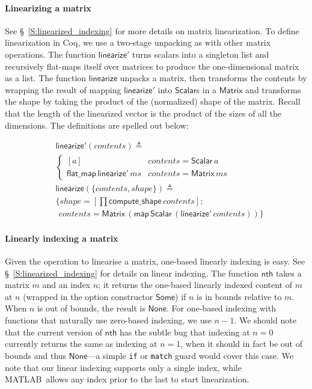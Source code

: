 \documentclass[11pt,conference]{IEEEtran}
\newcommand{\matlab}{MATLAB}
\newcommand{\var}[1]{\mathit{#1}}
\newcommand{\func}[1]{\mathsf{#1}}
\theoremstyle{plain} %
\theoremstyle{definition}
\theoremstyle{remark}
\begin{document}
\paragraph{Linearizing a matrix}\label{S:linearize_coq} See
\S~\ref{S:linearized_indexing} for more details on matrix linearization. To
define linearization in Coq, we use a two-stage unpacking as with other matrix
operations. The function \(\func{linearize'}\) turns scalars into a singleton
list and recursively flat-maps itself over matrices to produce the
one-dimensional matrix as a list. The function \(\func{linearize}\) unpacks a
matrix, then transforms the contents by wrapping the result of mapping
\(\func{linearize'}\) into \(\func{Scalar}\)s in a \(\func{Matrix}\) and
transforms the shape by taking the product of the (normalized) shape of the
matrix. Recall that the length of the linearized vector is the product of the
sizes of all the dimensions. The definitions are spelled out below:

\begin{align*}
    & \func{linearize'}(\var{contents}) \triangleq \\
    & \begin{cases}
        [\var{a}] & \var{contents} = \func{Scalar}\, \var{a} \\
        \func{flat\_map}\, \func{linearize'}\, \var{ms} & \var{contents} =
        \func{Matrix}\, ms
    \end{cases} \\
    & \func{linearize}(\{\var{contents}, \var{shape}\}) \triangleq \\
    & \{ \var{shape} = \left[\prod \func{compute\_shape}\, \var{contents}\right]; \\
    & \ \, \var{contents} = \func{Matrix}\, (\func{map}\, \func{Scalar}\, (\func{linearize'}\, \var{contents})) \}
\end{align*}

\paragraph{Linearly indexing a matrix} Given the operation to linearise a
matrix, one-based linearly indexing is easy. See \S~\ref{S:linearized_indexing}
for details on linear indexing. The function \(\func{nth}\) takes a matrix \(m\)
and an index \(n\); it returns the one-based linearly indexed content of \(m\)
at \(n\) (wrapped in the option constructor \(\func{Some}\)) if \(n\) is in
bounds relative to \(m\). When \(n\) is out of bounds, the result is
\(\func{None}\). For one-based indexing with functions that naturally use
zero-based indexing, we use \(n-1\). We should note that the current version of
\(\func{nth}\) has the subtle bug that indexing at \(n=0\) currently returns the
same as indexing at \(n=1\), when it should in fact be out of bounds and thus
\(\func{None}\)---a simple \texttt{if} or \texttt{match} guard would cover this
case. We note that our linear indexing supports only a single index, while
\matlab\ allows any index prior to the last to start linearization.
\end{document}
